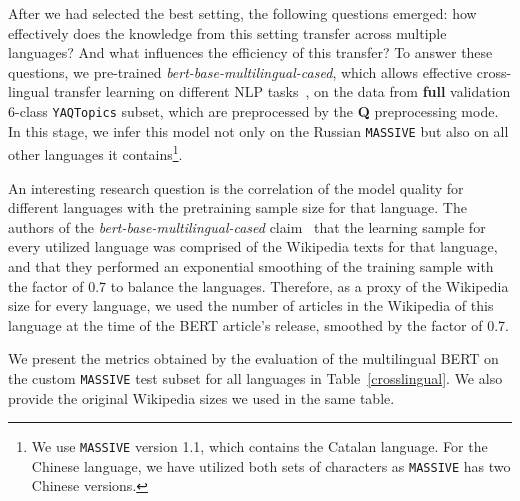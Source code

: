 After we had selected the best setting, the following questions emerged: how effectively does the knowledge from this setting transfer across multiple languages? And what influences the efficiency of this transfer? To answer these questions, we pre-trained \textit{bert-base-multilingual-cased}, which allows effective cross-lingual transfer learning on different NLP tasks~\cite{ner,squad}, on the data from \textbf{full} validation 6-class \texttt{YAQTopics} subset, which are preprocessed by the \textbf{Q} preprocessing mode. In this stage, we infer this model not only on the Russian \texttt{MASSIVE} but also on all other languages it contains\footnote{We use \texttt{MASSIVE} version 1.1, which contains the Catalan language. For the Chinese language, we have utilized both sets of characters as \texttt{MASSIVE} has two Chinese versions.}.

An interesting research question is the correlation of the model quality for different languages with the pretraining sample size for that language. The authors of the \textit{bert-base-multilingual-cased} claim~\cite{multilingual_bert} that the learning sample for every utilized language was comprised of the Wikipedia texts for that language, and that they performed an exponential smoothing of the training sample with the factor of 0.7 to balance the languages. Therefore, as a proxy of the Wikipedia size for every language, we used the number of articles in the Wikipedia of this language at the time of the BERT article's release, smoothed by the factor of 0.7. 

We present the metrics obtained by the evaluation of the multilingual BERT on the custom \texttt{MASSIVE} test subset for all languages in Table~\ref{crosslingual}. We also provide the original Wikipedia sizes we used in the same table.


